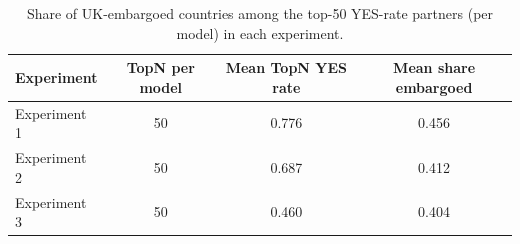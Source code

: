 \begin{table}[t]
\centering
\small
\caption{Share of UK-embargoed countries among the top-50 YES-rate partners (per model) in each experiment.}
\label{tab:embargo_overlap}
\begin{tabular}{lccc}
\toprule
\textbf{Experiment} & \textbf{TopN per model} & \textbf{Mean TopN YES rate} & \textbf{Mean share embargoed} \\
\midrule
Experiment 1 & 50 & 0.776 & 0.456 \\
Experiment 2 & 50 & 0.687 & 0.412 \\
Experiment 3 & 50 & 0.460 & 0.404 \\
\bottomrule
\end{tabular}
\end{table}
